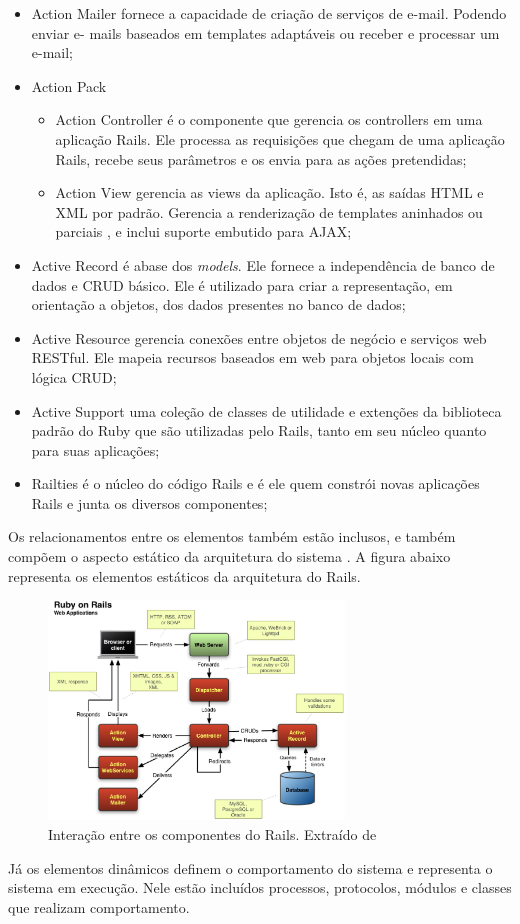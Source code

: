 \begin{itemize}
\item Action Mailer fornece a capacidade de criação de serviços de e-mail. Podendo enviar e-
mails baseados em templates adaptáveis ou receber e processar um e-mail;
\item Action Pack
 \begin{itemize}
 \item Action Controller é o componente que gerencia os controllers em uma aplicação
Rails. Ele processa as requisições que chegam de uma aplicação Rails, recebe seus
parâmetros e os envia para as ações pretendidas; 
 \item Action View gerencia as views da aplicação. Isto é, as saídas HTML e XML por
padrão. Gerencia a renderização de templates aninhados ou parciais , e inclui suporte
embutido para AJAX;
 \end{itemize}
\item Active Record é abase dos \textit{models}. Ele fornece a independência de banco de dados e CRUD básico. Ele é utilizado para criar a representação, em orientação a objetos, dos
dados presentes no banco de dados;
\item Active Resource gerencia conexões entre objetos de negócio e serviços web RESTful.
Ele mapeia recursos baseados em web para objetos locais com lógica CRUD;
\item Active Support uma coleção de classes de utilidade e extenções da biblioteca padrão do
Ruby que são utilizadas pelo Rails, tanto em seu núcleo quanto para suas aplicações;
\item Railties é o núcleo do código Rails e é ele quem constrói novas aplicações Rails e junta os diversos componentes;
\end{itemize}

Os relacionamentos entre os elementos também estão inclusos, e também compõem o aspecto estático da arquitetura do sistema \cite{germoglio2010fundamentos}. A figura abaixo representa os elementos estáticos da arquitetura do Rails.

\graphicspath{{figuras/}}
\begin{figure}[H]
\centering
\includegraphics[width=0.7\textwidth]{rails-overview}
\caption{Interação entre os componentes do Rails. Extraído  de \cite{mejia2011rails}}
\label{rails-architecture}
\end{figure}

Já os elementos dinâmicos definem o comportamento do sistema e representa o sistema em execução. Nele estão incluídos processos, protocolos, módulos e classes que realizam comportamento.

